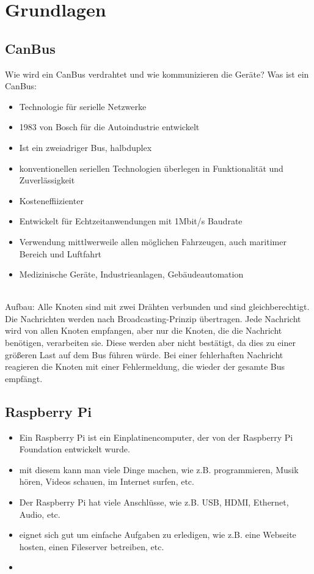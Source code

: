 \chapter{Grundlagen}


\section{CanBus}
Wie wird ein CanBus verdrahtet und wie kommunizieren die Geräte?
Was ist ein CanBus:
\begin{itemize}
    \item Technologie für serielle Netzwerke
    \item 1983 von Bosch für die Autoindustrie entwickelt
    \item Ist ein zweiadriger Bus, halbduplex
    \item konventionellen seriellen Technologien überlegen in Funktionalität und Zuverlässigkeit
    \item Kosteneffiizienter
    \item Entwickelt für Echtzeitanwendungen mit 1Mbit/s Baudrate
    \item Verwendung mittlwerweile allen möglichen Fahrzeugen, auch maritimer Bereich und Luftfahrt
    \item Medizinische Geräte, Industrieanlagen, Gebäudeautomation
\end{itemize}

\cite[Seiten 2-10]{Voss2008}
\\
Aufbau:
Alle Knoten sind mit zwei Drähten verbunden und sind gleichberechtigt.
\cite[Seite 132]{Voss2008}
\\
Die Nachrichten werden nach Broadcasting-Prinzip übertragen. Jede Nachricht wird von allen Knoten empfangen, 
aber nur die Knoten, die die Nachricht benötigen, verarbeiten sie. Diese werden aber nicht bestätigt,
da dies zu einer größeren Last auf dem Bus führen würde. Bei einer fehlerhaften Nachricht reagieren
die Knoten mit einer Fehlermeldung, die wieder der gesamte Bus empfängt.
\cite[Seite 80]{Voss2008}


\section{Raspberry Pi}
\begin{itemize}
    \item Ein Raspberry Pi ist ein Einplatinencomputer, der von der Raspberry Pi Foundation entwickelt wurde.
    \item mit diesem kann man viele Dinge machen, wie z.B. programmieren, Musik hören, Videos schauen, im Internet surfen, etc.
    \item Der Raspberry Pi hat viele Anschlüsse, wie z.B. USB, HDMI, Ethernet, Audio, etc.
    \item eignet sich gut um einfache Aufgaben zu erledigen, wie z.B. eine Webseite hosten, einen Fileserver betreiben, etc.
    \item 
\end{itemize}

